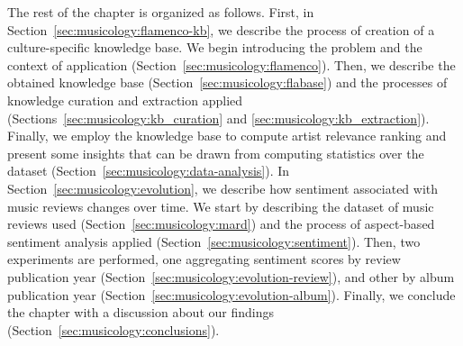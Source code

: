 
The rest of the chapter is organized as follows. First, in Section~\ref{sec:musicology:flamenco-kb}, we describe the process of creation of a culture-specific knowledge base. We begin introducing the problem and the context of application (Section~\ref{sec:musicology:flamenco}). Then, we describe the obtained knowledge base (Section~\ref{sec:musicology:flabase}) and the processes of knowledge curation and extraction applied (Sections~\ref{sec:musicology:kb_curation} and \ref{sec:musicology:kb_extraction}). Finally, we employ the knowledge base to compute artist relevance ranking and present some insights that can be drawn from computing statistics over the dataset (Section~\ref{sec:musicology:data-analysis}). In Section~\ref{sec:musicology:evolution}, we describe how sentiment associated with music reviews changes over time. We start by describing the dataset of music reviews used (Section~\ref{sec:musicology:mard}) and the process of aspect-based sentiment analysis applied (Section~\ref{sec:musicology:sentiment}). Then, two experiments are performed, one aggregating sentiment scores by review publication year (Section~\ref{sec:musicology:evolution-review}), and other by album publication year (Section~\ref{sec:musicology:evolution-album}). Finally, we conclude the chapter with a discussion about our findings (Section~\ref{sec:musicology:conclusions}). 


